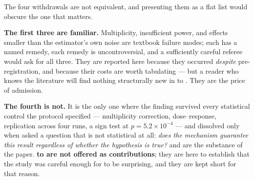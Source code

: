 The four withdrawals are not equivalent, and presenting them as a flat list would obscure the
one that matters.

\textbf{The first three are familiar.} Multiplicity, insufficient power, and effects smaller than the
estimator's own noise are textbook failure modes; each has a named remedy, each remedy is
uncontroversial, and a sufficiently careful referee would ask for all three. They are reported
here because they occurred \emph{despite} pre-registration, and because their costs are worth
tabulating --- but a reader who knows the literature will find nothing structurally new in 
to . They are the price of admission.

\textbf{The fourth is not.} It is the only one where the finding survived every statistical control
the protocol specified --- multiplicity correction, dose--response, replication across four runs, a
sign test at \(p = 5.2 \times 10^{-4}\) --- and dissolved only when asked a question that is not
statistical at all: \emph{does the mechanism guarantee this result regardless of whether the
hypothesis is true?}  and  are the substance of the paper. \textbf{ to  are not
offered as contributions}; they are here to establish that the study was careful enough for
 to be surprising, and they are kept short for that reason.

